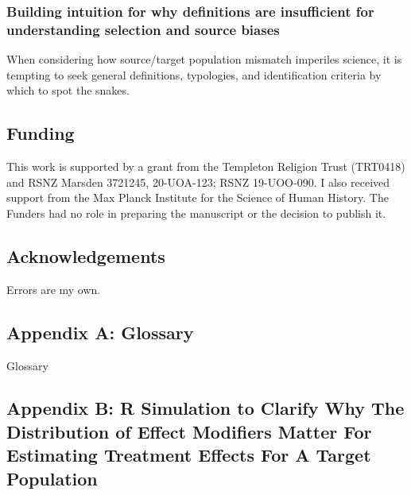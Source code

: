 \documentclass[
  single column]{article}
\begin{document}
\subsubsection{Building intuition for why definitions are insufficient
for understanding selection and source
biases}\label{building-intuition-for-why-definitions-are-insufficient-for-understanding-selection-and-source-biases}

When considering how source/target population mismatch imperiles
science, it is tempting to seek general definitions, typologies, and
identification criteria by which to spot the snakes.

\newpage{}

\subsection{Funding}\label{funding}

This work is supported by a grant from the Templeton Religion Trust
(TRT0418) and RSNZ Marsden 3721245, 20-UOA-123; RSNZ 19-UOO-090. I also
received support from the Max Planck Institute for the Science of Human
History. The Funders had no role in preparing the manuscript or the
decision to publish it.

\subsection{Acknowledgements}\label{acknowledgements}

Errors are my own.

\newpage{}

\subsection{Appendix A: Glossary}\label{appendix-a-glossary}

\begin{table}

\caption{\label{tbl-experiments}Glossary}

\centering{

\glossaryTerms

}

\end{table}%

\newpage{}

\subsection{Appendix B: R Simulation to Clarify Why The Distribution of
Effect Modifiers Matter For Estimating Treatment Effects For A Target
Population}\label{appendix-b-r-simulation-to-clarify-why-the-distribution-of-effect-modifiers-matter-for-estimating-treatment-effects-for-a-target-population}
\end{document}
